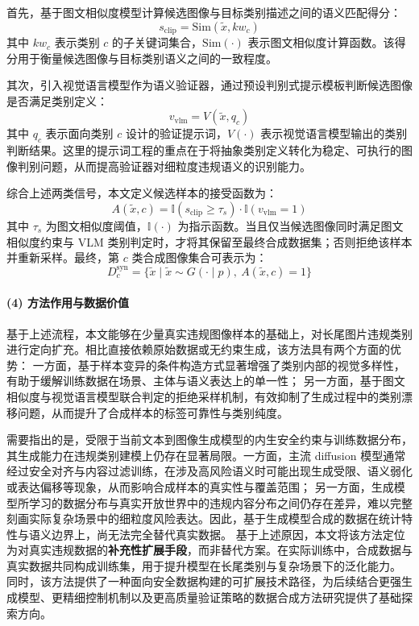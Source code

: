 首先，基于图文相似度模型计算候选图像与目标类别描述之间的语义匹配得分：
\begin{equation}
s_{\mathrm{clip}} = \mathrm{Sim}(\tilde{x}, kw_c)
\end{equation}
其中 $kw_c$ 表示类别 $c$ 的子关键词集合，$\mathrm{Sim}(\cdot)$ 表示图文相似度计算函数。该得分用于衡量候选图像与目标类别语义之间的一致程度。

其次，引入视觉语言模型作为语义验证器，通过预设判别式提示模板判断候选图像是否满足类别定义：
\begin{equation}
v_{\mathrm{vlm}} = V(\tilde{x}, q_c)
\end{equation}
其中 $q_c$ 表示面向类别 $c$ 设计的验证提示词，$V(\cdot)$ 表示视觉语言模型输出的类别判断结果。这里的提示词工程的重点在于将抽象类别定义转化为稳定、可执行的图像判别问题，从而提高验证器对细粒度违规语义的识别能力。

综合上述两类信号，本文定义候选样本的接受函数为：
\begin{equation}
A(\tilde{x}, c) =
\mathbb{I}(s_{\mathrm{clip}} \ge \tau_s)
\cdot
\mathbb{I}(v_{\mathrm{vlm}} = 1)
\end{equation}
其中 $\tau_s$ 为图文相似度阈值，$\mathbb{I}(\cdot)$ 为指示函数。当且仅当候选图像同时满足图文相似度约束与 VLM 类别判定时，才将其保留至最终合成数据集；否则拒绝该样本并重新采样。最终，第 $c$ 类合成图像集合可表示为：
\begin{equation}
D_c^{\mathrm{syn}} =
\{\tilde{x}\mid \tilde{x} \sim G(\cdot \mid p), \ A(\tilde{x}, c)=1\}
\end{equation}

\paragraph{(4) 方法作用与数据价值}
基于上述流程，本文能够在少量真实违规图像样本的基础上，对长尾图片违规类别进行定向扩充。相比直接依赖原始数据或无约束生成，该方法具有两个方面的优势：
一方面，基于样本变异的条件构造方式显著增强了类别内部的视觉多样性，有助于缓解训练数据在场景、主体与语义表达上的单一性；
另一方面，基于图文相似度与视觉语言模型联合判定的拒绝采样机制，有效抑制了生成过程中的类别漂移问题，从而提升了合成样本的标签可靠性与类别纯度。

需要指出的是，受限于当前文本到图像生成模型的内生安全约束与训练数据分布，其生成能力在违规类别建模上仍存在显著局限。一方面，主流 diffusion 模型通常经过安全对齐与内容过滤训练，在涉及高风险语义时可能出现生成受限、语义弱化或表达偏移等现象，从而影响合成样本的真实性与覆盖范围；
另一方面，生成模型所学习的数据分布与真实开放世界中的违规内容分布之间仍存在差异，难以完整刻画实际复杂场景中的细粒度风险表达。因此，基于生成模型合成的数据在统计特性与语义边界上，尚无法完全替代真实数据。
基于上述原因，本文将该方法定位为对真实违规数据的\textbf{补充性扩展手段}，而非替代方案。在实际训练中，合成数据与真实数据共同构成训练集，用于提升模型在长尾类别与复杂场景下的泛化能力。
同时，该方法提供了一种面向安全数据构建的可扩展技术路径，为后续结合更强生成模型、更精细控制机制以及更高质量验证策略的数据合成方法研究提供了基础探索方向。

